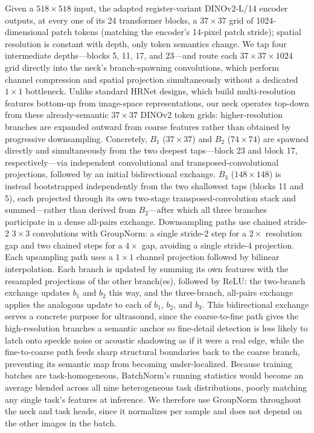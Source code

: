 \documentclass[runningheads]{llncs}
\begin{document}
Given a $518\times518$ input, the adapted register-variant DINOv2-L/14 encoder outputs, at every one of its 24 transformer blocks, a $37\times37$ grid of 1024-dimensional patch tokens (matching the encoder's 14-pixel patch stride); spatial resolution is constant with depth, only token semantics change. We tap four intermediate depths---blocks 5, 11, 17, and 23---and route each $37\times37\times1024$ grid directly into the neck's branch-spawning convolutions, which perform channel compression and spatial projection simultaneously without a dedicated $1\times1$ bottleneck.
Unlike standard HRNet designs, which build multi-resolution features bottom-up from image-space representations, our neck operates top-down from these already-semantic $37\times37$ DINOv2 token grids: higher-resolution branches are expanded outward from coarse features rather than obtained by progressive downsampling. Concretely, $B_1$ ($37\times37$) and $B_2$ ($74\times74$) are spawned directly and simultaneously from the two deepest taps---block 23 and block 17, respectively---via independent convolutional and transposed-convolutional projections, followed by an initial bidirectional exchange. $B_3$ ($148\times148$) is instead bootstrapped independently from the two shallowest taps (blocks 11 and 5), each projected through its own two-stage transposed-convolution stack and summed---rather than derived from $B_2$---after which all three branches participate in a dense all-pairs exchange.
Downsampling paths use chained stride-2 $3\times3$ convolutions with GroupNorm: a single stride-2 step for a $2\times$ resolution gap and two chained steps for a $4\times$ gap, avoiding a single stride-4 projection. Each upsampling path uses a $1\times1$ channel projection followed by bilinear interpolation. Each branch is updated by summing its own features with the resampled projections of the other branch(es), followed by ReLU: the two-branch exchange updates $b_1$ and $b_2$ this way, and the three-branch, all-pairs exchange applies the analogous update to each of $b_1$, $b_2$, and $b_3$. This bidirectional exchange serves a concrete purpose for ultrasound, since the coarse-to-fine path gives the high-resolution branches a semantic anchor so fine-detail detection is less likely to latch onto speckle noise or acoustic shadowing as if it were a real edge, while the fine-to-coarse path feeds sharp structural boundaries back to the coarse branch, preventing its semantic map from becoming under-localized.
Because training batches are task-homogeneous, BatchNorm's running statistics would become an average blended across all nine heterogeneous task distributions, poorly matching any single task's features at inference. We therefore use GroupNorm throughout the neck and task heads, since it normalizes per sample and does not depend on the other images in the batch.
\end{document}
